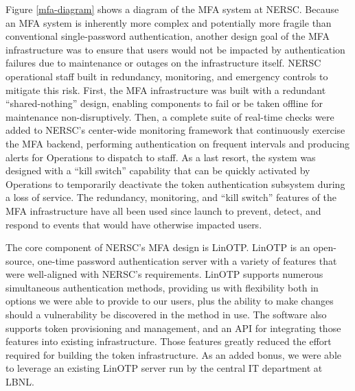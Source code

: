 \documentclass[sigconf,review]{acmart}
\begin{document}
Figure \ref{mfa-diagram} shows a diagram of the MFA system at NERSC. Because an
MFA system is inherently more complex and potentially more fragile than
conventional single-password authentication, another design goal of the MFA
infrastructure was to ensure that users would not be impacted by authentication
failures due to maintenance or outages on the infrastructure itself. NERSC
operational staff built in redundancy, monitoring, and emergency controls to
mitigate this risk. First, the MFA infrastructure was built with a redundant
``shared-nothing'' design, enabling components to fail or be taken offline for
maintenance non-disruptively. Then, a complete suite of real-time checks were
added to NERSC's center-wide monitoring framework that continuously exercise the
MFA backend, performing authentication on frequent intervals and producing
alerts for Operations to dispatch to staff. As a last resort, the system was
designed with a ``kill switch'' capability that can be quickly activated by
Operations to temporarily deactivate the token authentication subsystem during a
loss of service. The redundancy, monitoring, and ``kill switch'' features of the
MFA infrastructure have all been used since launch to prevent, detect, and
respond to events that would have otherwise impacted users.

The core component of NERSC's MFA design is LinOTP. LinOTP is an open-source,
one-time password authentication server \cite{linotp} with a variety of features
that were well-aligned with NERSC's requirements.  LinOTP supports numerous
simultaneous  authentication methods, providing us with flexibility both in
options we were able to provide to our users, plus the ability to make changes
should a vulnerability be discovered in the method in use.  The software also
supports token provisioning and management, and an API for integrating those
features into existing infrastructure. Those features greatly reduced the effort
required for building the token infrastructure. As an added bonus, we were able
to leverage an existing LinOTP server run by the central IT department at LBNL.
\end{document}
